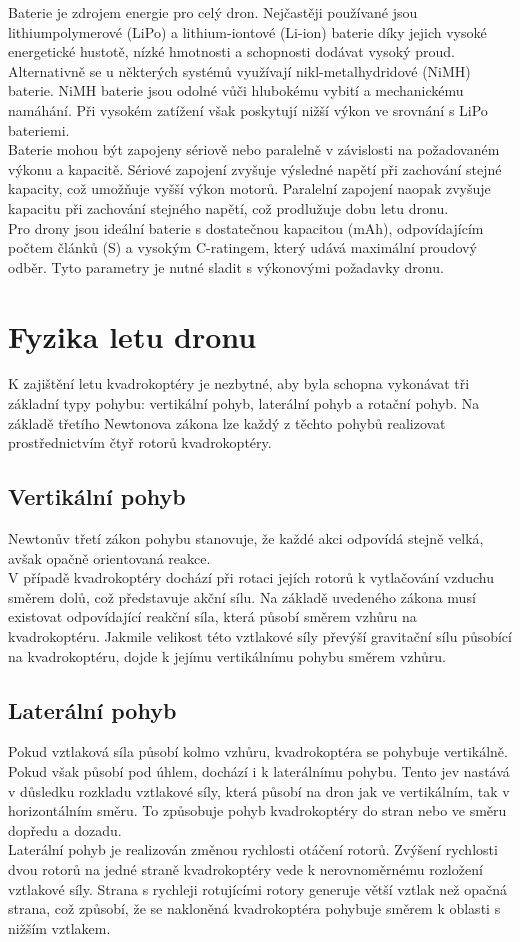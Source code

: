 \documentclass[12pt]{report}
\begin{document}
Baterie je zdrojem energie pro celý dron. Nejčastěji používané jsou lithiumpolymerové (LiPo) a lithium-iontové (Li-ion) baterie díky jejich vysoké energetické hustotě, nízké hmotnosti a schopnosti dodávat vysoký proud. Alternativně se u některých systémů využívají nikl-metalhydridové (NiMH) baterie. NiMH baterie jsou odolné vůči hlubokému vybití a mechanickému namáhání. Při vysokém zatížení však poskytují nižší výkon ve srovnání s LiPo bateriemi.\\
Baterie mohou být zapojeny sériově nebo paralelně v závislosti na požadovaném výkonu a kapacitě. Sériové zapojení zvyšuje výsledné napětí při zachování stejné kapacity, což umožňuje vyšší výkon motorů. Paralelní zapojení naopak zvyšuje kapacitu při zachování stejného napětí, což prodlužuje dobu letu dronu.\\
Pro drony jsou ideální baterie s dostatečnou kapacitou (mAh), odpovídajícím počtem článků (S) a vysokým C-ratingem, který udává maximální proudový odběr. Tyto parametry je nutné sladit s výkonovými požadavky dronu. 

\chapter{Fyzika letu dronu}
K zajištění letu kvadrokoptéry je nezbytné, aby byla schopna vykonávat tři základní typy pohybu: vertikální pohyb, laterální pohyb a rotační pohyb. Na základě třetího Newtonova zákona lze každý z těchto pohybů realizovat prostřednictvím čtyř rotorů kvadrokoptéry.

\section{Vertikální pohyb}
Newtonův třetí zákon pohybu stanovuje, že každé akci odpovídá stejně velká, avšak opačně orientovaná reakce.\\
V případě kvadrokoptéry dochází při rotaci jejích rotorů k vytlačování vzduchu směrem dolů, což představuje akční sílu. Na základě uvedeného zákona musí existovat odpovídající reakční síla, která působí směrem vzhůru na kvadrokoptéru. Jakmile velikost této vztlakové síly převýší gravitační sílu působící na kvadrokoptéru, dojde k jejímu vertikálnímu pohybu směrem vzhůru.

\section{Laterální pohyb}
Pokud vztlaková síla působí kolmo vzhůru, kvadrokoptéra se pohybuje vertikálně. Pokud však působí pod úhlem, dochází i k laterálnímu pohybu. Tento jev nastává v důsledku rozkladu vztlakové síly, která působí na dron jak ve vertikálním, tak v horizontálním směru. To způsobuje pohyb kvadrokoptéry do stran nebo ve směru dopředu a dozadu.\\
Laterální pohyb je realizován změnou rychlosti otáčení rotorů. Zvýšení rychlosti dvou rotorů na jedné straně kvadrokoptéry vede k nerovnoměrnému rozložení vztlakové síly. Strana s rychleji rotujícími rotory generuje větší vztlak než opačná strana, což způsobí, že se nakloněná kvadrokoptéra pohybuje směrem k oblasti s nižším vztlakem.
\end{document}
